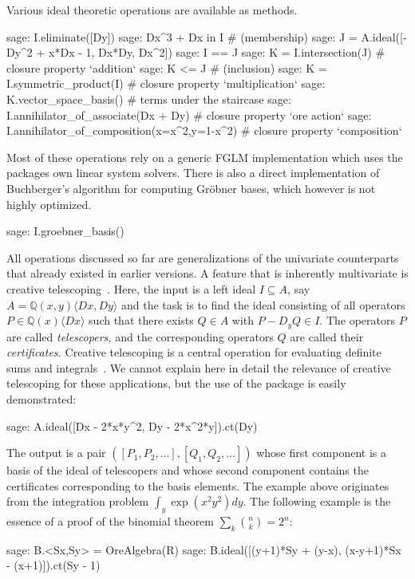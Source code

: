\documentclass[11pt]{article}
\def\<#1>{\langle#1\rangle}
\let\set\mathbb
\begin{document}
Various ideal theoretic operations are available as methods. 
\begin{sageexample}
  sage: I.eliminate([Dy])
  sage: Dx^3 + Dx in I # (membership)
  sage: J = A.ideal([-Dy^2 + x*Dx - 1, Dx*Dy, Dx^2])
  sage: I == J
  sage: K = I.intersection(J) # closure property `addition`
  sage: K <= J # (inclusion)
  sage: K = I.symmetric_product(I) # closure property `multiplication`
  sage: K.vector_space_basis() # terms under the staircase
  sage: I.annihilator_of_associate(Dx + Dy) # closure property `ore action`
  sage: I.annihilator_of_composition(x=x^2,y=1-x^2) # closure property `composition`
\end{sageexample}
Most of these operations rely on a generic FGLM implementation which uses the packages own linear system solvers.
There is also a direct implementation of Buchberger's algorithm for computing Gr\"obner bases, which however is
not highly optimized. 
\begin{sageexample}
  sage: I.groebner_basis()
\end{sageexample}

All operations discussed so far are generalizations of the univariate counterparts that already existed
in earlier versions. A feature that is inherently multivariate is creative telescoping~\cite{zeilberger91,chyzak00,chyzak14}.
Here, the input is a left ideal $I\subseteq A$, say $A=\set Q(x,y)\<Dx,Dy>$ and the task is to find
the ideal consisting of all operators $P\in\set Q(x)\<Dx>$ such that there exists $Q\in A$ with $P-D_yQ\in I$.
The operators $P$ are called \emph{telescopers,} and the corresponding operators $Q$ are called their \emph{certificates.}
Creative telescoping is a central operation for evaluating definite sums and integrals~\cite{chyzak14}.
We cannot explain here in detail the relevance of creative telescoping for these applications, but the use of the
package is easily demonstrated:
\begin{sageexample}
  sage: A.ideal([Dx - 2*x*y^2, Dy - 2*x^2*y]).ct(Dy)
\end{sageexample}
The output is a pair $([P_1,P_2,\dots],[Q_1,Q_2,\dots])$ whose first component is a basis of the ideal of telescopers
and whose second component contains the certificates corresponding to the basis elements.
The example above originates from the integration problem $\int_y\exp(x^2y^2)dy$. The following example is the essence
of a proof of the binomial theorem $\sum_k\binom nk=2^n$:
\begin{sageexample}
  sage: B.<Sx,Sy> = OreAlgebra(R)
  sage: B.ideal([(y+1)*Sy + (y-x), (x-y+1)*Sx - (x+1)]).ct(Sy - 1)
\end{sageexample}
\end{document}
